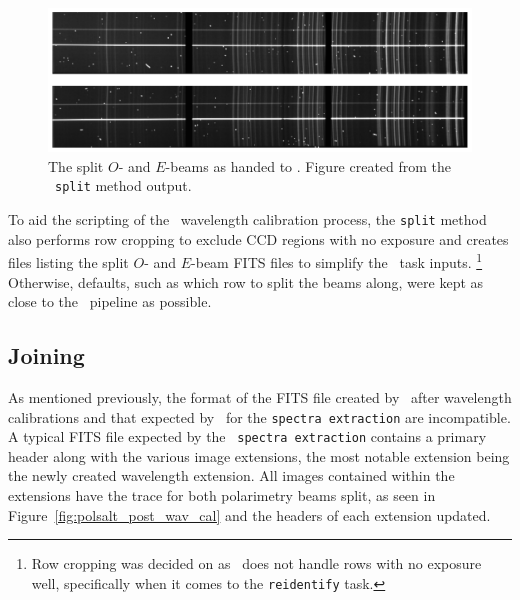 \begin{figure}[t]
    \centering
    \includegraphics[width = 1.0\textwidth]{figures/3_OEsplit.pdf}
    \caption{The split $O$- and $E$-beams as handed to \iraf. Figure created from the \stops\ \texttt{split} method output.}
    \label{fig:OE_split}
\end{figure}

To aid the scripting of the \iraf\ wavelength calibration process, the \texttt{split} method also performs row cropping to exclude \gls{CCD} regions with no exposure and creates files listing the split $O$- and $E$-beam \gls{FITS} files to simplify the \iraf\ task inputs.%
\footnote{Row cropping was decided on as \iraf\ does not handle rows with no exposure well, specifically when it comes to the \texttt{reidentify} task.}
Otherwise, defaults, such as which row to split the beams along, were kept as close to the \polsalt\ pipeline as possible.

\subsection{Joining} \label{subsec:stops_join}



As mentioned previously, the format of the \gls{FITS} file created by \iraf\ after wavelength calibrations and that expected by \polsalt\ for the \texttt{spectra extraction} are incompatible. A typical \gls{FITS} file expected by the \polsalt\ \texttt{spectra extraction} contains a primary header along with the various image extensions, the most notable extension being the newly created wavelength extension. All images contained within the extensions have the trace for both polarimetry beams split, as seen in Figure~\ref{fig:polsalt_post_wav_cal} and the headers of each extension updated.


